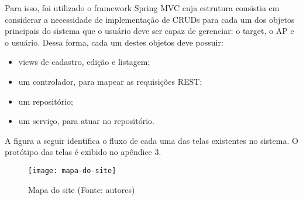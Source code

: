 Para isso, foi utilizado o framework Spring MVC cuja estrutura consistia em considerar a necessidade de implementação de CRUDs para cada um dos objetos principais do sistema que o usuário deve ser capaz de gerenciar: o target, o AP e o usuário. Dessa forma, cada um destes objetos deve possuir:

\begin{itemize}
	\item views de cadastro, edição e listagem;
	\item um controlador, para mapear as requisições REST;
	\item um repositório;
	\item um serviço, para atuar no repositório.
\end{itemize}

A figura a seguir identifica o fluxo de cada uma das telas existentes no sistema. O protótipo das telas é exibido no apêndice 3.

\begin{figure}[ht]
  \centering
    \texttt{[image: mapa-do-site]}
  \caption{Mapa do site (Fonte: autores)}
\end{figure}
\FloatBarrier
